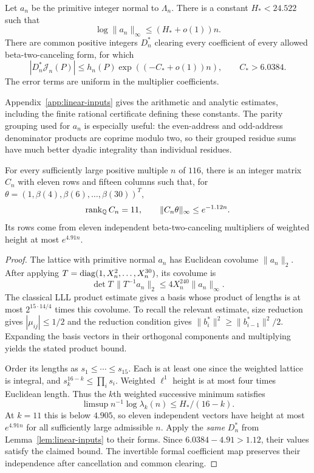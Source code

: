 \begin{lemma}\label{lem:linear-inputs}
Let $a_n$ be the primitive integer normal to $\Lambda_n$. There is
a constant $H_*<24.522$ such that
\[
 \log\|a_n\|_\infty\leq(H_*+o(1))n.
\]
There are common positive integers $D_n^*$ clearing every coefficient
of every allowed beta-two-canceling form, for which
\[
 |D_n^*\mathcal J_n(P)|
 \leq h_n(P)\exp((-C_*+o(1))n),\qquad C_*>6.0384.
\]
The error terms are uniform in the multiplier coefficients.
\end{lemma}
Appendix~\ref{app:linear-inputs} gives the arithmetic and analytic
estimates, including the finite rational certificate defining these
constants. The parity grouping used for $a_n$ is especially useful:
the even-address and odd-address denominator products are coprime
modulo two, so their grouped residue sums have much better dyadic
integrality than individual residues.

\begin{theorem}\label{thm:eleven}
For every sufficiently large positive multiple $n$ of $116$, there
is an integer matrix $C_n$ with eleven rows and fifteen columns such
that, for $\theta=(1,\beta(4),\beta(6),\ldots,\beta(30))^T$,
\[
 \operatorname{rank}_{\mathbb Q}C_n=11,\qquad \|C_n\theta\|_\infty\leq e^{-1.12n}.
\]
Its rows come from eleven independent beta-two-canceling multipliers
of weighted height at most $e^{4.91n}$.
\end{theorem}
\begin{proof}
The lattice with primitive normal $a_n$ has Euclidean covolume
$\|a_n\|_2$. After applying
$T=\operatorname{diag}(1,X_n^2,\ldots,X_n^{30})$, its covolume is
\[
 \det T\,\|T^{-1}a_n\|_2\leq4X_n^{240}\|a_n\|_\infty.
\]
The classical LLL product estimate \cite[Proposition~1.6]{LLL} gives
a basis whose product of lengths is at most
$2^{15\cdot14/4}$ times this covolume. To recall the relevant estimate,
size reduction gives $|\mu_{ij}|\leq1/2$ and the reduction condition
gives $\|b_i^*\|^2\geq\|b_{i-1}^*\|^2/2$. Expanding the basis
vectors in their orthogonal components and multiplying yields the
stated product bound.

Order its lengths as $s_1\leq\cdots\leq s_{15}$. Each is at least
one since the weighted lattice is integral, and
$s_k^{16-k}\leq\prod_i s_i$. Weighted $\ell^1$ height is at most
four times Euclidean length. Thus the $k$th weighted successive
minimum satisfies
\[
 \limsup n^{-1}\log\lambda_k(n)\leq H_* /(16-k).
\]
At $k=11$ this is below $4.905$, so eleven independent vectors have
height at most $e^{4.91n}$ for all sufficiently large admissible $n$.
Apply the \emph{same} $D_n^*$ from Lemma~\ref{lem:linear-inputs} to
their forms. Since $6.0384-4.91>1.12$, their values satisfy the claimed
bound. The invertible formal coefficient map preserves their
independence after cancellation and common clearing.
\end{proof}

